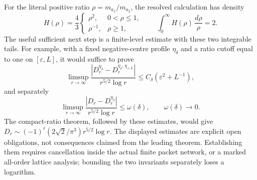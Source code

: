 For the literal positive ratio $\rho=m_{a_1}/m_{a_2}$, the resolved
calculation has density
\[
 H(\rho)=\frac43
  \begin{cases}\rho^2,&0<\rho\leq1,\\ \rho^{-1},&\rho\geq1,
  \end{cases}
 \qquad
 \int_0^\infty H(\rho)\,\frac{d\rho}{\rho}=2.
\]
The useful sufficient next step is a finite-level estimate with
these two integrable tails.  For example, with a fixed negative-centre
profile $\eta_\delta$ and a ratio cutoff equal to one on
$[\varepsilon,L]$, it would suffice to prove
\[
 \limsup_{r\to\infty}
 \frac{|D_r^{\eta_\delta}-D_r^{\eta_\delta,\chi_{\varepsilon,L}}|}
      {r^{5/2}\log r}
 \leq C_\delta(\varepsilon^2+L^{-1}),
\]
and separately
\[
 \limsup_{r\to\infty}
 \frac{|D_r-D_r^{\eta_\delta}|}{r^{5/2}\log r}
      \leq\omega(\delta),\qquad \omega(\delta)\longrightarrow0.
\]
The compact-ratio theorem, followed by these estimates, would give
$D_r\sim(-1)^r(2\sqrt2/\pi^3)r^{5/2}\log r$.
The displayed estimates are explicit open obligations, not consequences
claimed from the leading theorem.  Establishing them requires cancellation
inside the actual finite packet network, or a marked all-order lattice
analysis; bounding the two invariants separately loses a logarithm.
